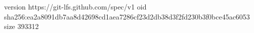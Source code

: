 version https://git-lfs.github.com/spec/v1
oid sha256:ea2a8091db7aa8d42698cd1aea7286cf23d2db38d3f2fd230b3f0bce45ac6053
size 393312
